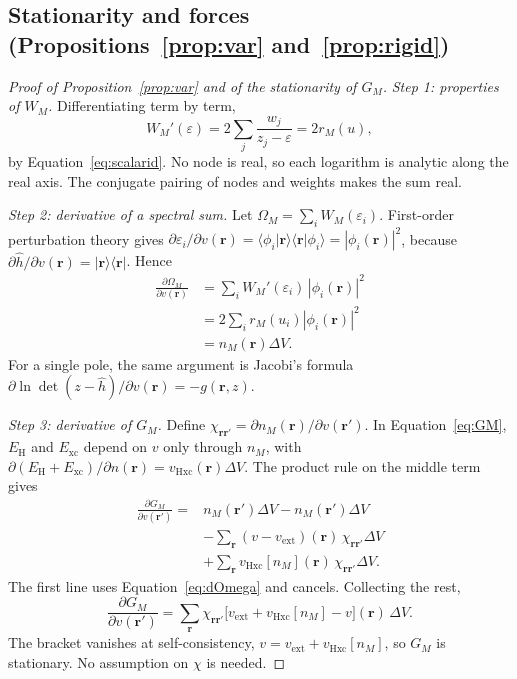 \documentclass[aps,prb,twocolumn,superscriptaddress,floatfix,longbibliography]{revtex4-2}
\theoremstyle{remark}
\begin{document}
\subsection{Stationarity and forces (Propositions~\ref{prop:var} and~\ref{prop:rigid})}

\begin{proof}[Proof of Proposition~\ref{prop:var} and of the stationarity of $G_M$]
\emph{Step 1: properties of $W_M$.} Differentiating term by term,
\begin{equation}
W_M'(\varepsilon)=2\sum_j\frac{w_j}{z_j-\varepsilon}=2r_M(u),
\end{equation}
by Equation~\eqref{eq:scalarid}. No node is real, so each logarithm is analytic along the real axis. The conjugate pairing of
nodes and weights makes the sum real.

\emph{Step 2: derivative of a spectral sum.} Let $\Omega_M=\sum_iW_M(\varepsilon_i)$. First-order perturbation theory gives
$\partial\varepsilon_i/\partial v(\bm r)=\langle\phi_i|\bm r\rangle\langle\bm r|\phi_i\rangle=|\phi_i(\bm r)|^2$, because
$\partial\hat h/\partial v(\bm r)=|\bm r\rangle\langle\bm r|$. Hence
\begin{align}
\frac{\partial\Omega_M}{\partial v(\bm r)}
&=\sum_iW_M'(\varepsilon_i)\,|\phi_i(\bm r)|^2\nonumber\\
&=2\sum_ir_M(u_i)|\phi_i(\bm r)|^2\nonumber\\
&=n_M(\bm r)\Delta V .
\label{eq:dOmega}
\end{align}
For a single pole, the same argument is Jacobi's formula
$\partial\ln\det(z-\hat h)/\partial v(\bm r)=-g(\bm r,z)$.

\emph{Step 3: derivative of $G_M$.} Define $\chi_{\bm r\bm r'}=\partial n_M(\bm r)/\partial v(\bm r')$. In
Equation~\eqref{eq:GM}, $E_\mathrm H$ and $E_\mathrm{xc}$ depend on $v$ only through $n_M$, with
$\partial(E_\mathrm H+E_\mathrm{xc})/\partial n(\bm r)=v_\mathrm{Hxc}(\bm r)\Delta V$. The product rule on the middle term gives
\begin{align}
\frac{\partial G_M}{\partial v(\bm r')}
={}&n_M(\bm r')\Delta V-n_M(\bm r')\Delta V\nonumber\\
&-\sum_{\bm r}(v-v_\mathrm{ext})(\bm r)\,\chi_{\bm r\bm r'}\Delta V\nonumber\\
&+\sum_{\bm r}v_\mathrm{Hxc}[n_M](\bm r)\,\chi_{\bm r\bm r'}\Delta V .
\end{align}
The first line uses Equation~\eqref{eq:dOmega} and cancels. Collecting the rest,
\begin{equation}
\frac{\partial G_M}{\partial v(\bm r')}
=\sum_{\bm r}\chi_{\bm r\bm r'}\big[v_\mathrm{ext}+v_\mathrm{Hxc}[n_M]-v\big](\bm r)\,\Delta V .
\end{equation}
The bracket vanishes at self-consistency, $v=v_\mathrm{ext}+v_\mathrm{Hxc}[n_M]$, so $G_M$ is stationary. No assumption on
$\chi$ is needed.


\end{proof}
\end{document}
